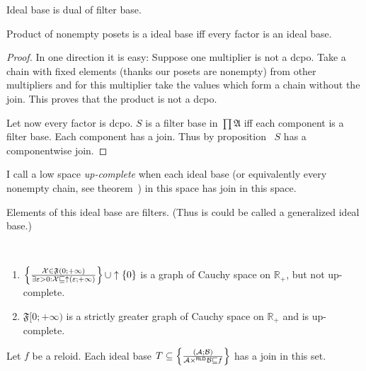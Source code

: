 \begin{obvious}
Ideal base is dual of filter base.
\end{obvious}

\begin{thm}
  Product of nonempty posets is a ideal base iff every factor is an ideal
  base.
\end{thm}

\begin{proof}
  
  In one direction it is easy: Suppose one multiplier is not a dcpo. Take a
  chain with fixed elements (thanks our posets are nonempty) from other
  multipliers and for this multiplier take the values which form a chain
  without the join. This proves that the product is not a dcpo.
  
  Let now every factor is dcpo. $S$ is a filter base in $\prod \mathfrak{A}$
  iff each component is a filter base. Each component has a join. Thus by proposition~ $S$ has a componentwise join.
\end{proof}

\begin{defn}
  I call a low space \emph{up-complete} when each ideal base (or
  equivalently every nonempty chain, see theorem~) in this space has join in
  this space.
\end{defn}

\begin{rem}
  Elements of this ideal base are filters. (Thus is could be called a
  generalized ideal base.)
\end{rem}

\begin{example}
  ~  
  \begin{enumerate}
    \item $\left\{ \frac{ \mathcal{X} \in \mathfrak{F} (0 ; + \infty) }{
    \exists \varepsilon > 0 : \mathcal{X} \sqsubseteq \uparrow
    (\varepsilon ; + \infty) }\right\} \cup \uparrow\{ 0 \}$ is a graph of Cauchy space
    on $\mathbb{R}_+$, but not up-complete.
    
    \item $\mathfrak{F} [0 ; + \infty)$ is a strictly greater graph of Cauchy
    space on $\mathbb{R}_+$ and is up-complete.
  \end{enumerate}
\end{example}

\begin{lem}
  Let $f$ be a reloid. Each ideal base $T \subseteq \left\{ \frac{ (\mathcal{A} ;
  \mathcal{B}) }{ \mathcal{A}
  \times^{\mathsf{RLD}} \mathcal{B} \sqsubseteq f }\right\}$ has a join
  in this set.
\end{lem}

